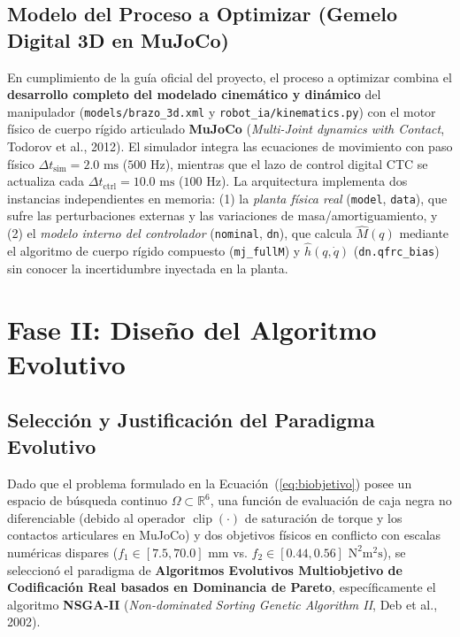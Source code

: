 \documentclass[11pt,a4paper]{article}
\begin{document}
\subsection{Modelo del Proceso a Optimizar (Gemelo Digital 3D en MuJoCo)}
En cumplimiento de la guía oficial del proyecto, el proceso a optimizar combina el \textbf{desarrollo completo del modelado cinemático y dinámico} del manipulador (\texttt{models/brazo\_3d.xml} y \texttt{robot\_ia/kinematics.py}) con el motor físico de cuerpo rígido articulado \textbf{MuJoCo} (\textit{Multi-Joint dynamics with Contact}, Todorov et al., 2012). El simulador integra las ecuaciones de movimiento con paso físico $\Delta t_{\text{sim}} = 2.0\text{ ms}$ ($500\text{ Hz}$), mientras que el lazo de control digital CTC se actualiza cada $\Delta t_{\text{ctrl}} = 10.0\text{ ms}$ ($100\text{ Hz}$). La arquitectura implementa dos instancias independientes en memoria: (1) la \textit{planta física real} (\texttt{model}, \texttt{data}), que sufre las perturbaciones externas y las variaciones de masa/amortiguamiento, y (2) el \textit{modelo interno del controlador} (\texttt{nominal}, \texttt{dn}), que calcula $\hat{M}(q)$ mediante el algoritmo de cuerpo rígido compuesto (\texttt{mj\_fullM}) y $\hat{h}(q,\dot{q})$ (\texttt{dn.qfrc\_bias}) sin conocer la incertidumbre inyectada en la planta.

\section{Fase II: Diseño del Algoritmo Evolutivo}

\subsection{Selección y Justificación del Paradigma Evolutivo}
Dado que el problema formulado en la Ecuación~(\ref{eq:biobjetivo}) posee un espacio de búsqueda continuo $\Omega \subset \mathbb{R}^6$, una función de evaluación de caja negra no diferenciable (debido al operador $\operatorname{clip}(\cdot)$ de saturación de torque y los contactos articulares en MuJoCo) y dos objetivos físicos en conflicto con escalas numéricas dispares ($f_1 \in [7.5, 70.0]\text{ mm}$ vs. $f_2 \in [0.44, 0.56]\text{ N}^2\text{m}^2\text{s}$), se seleccionó el paradigma de \textbf{Algoritmos Evolutivos Multiobjetivo de Codificación Real basados en Dominancia de Pareto}, específicamente el algoritmo \textbf{NSGA-II} (\textit{Non-dominated Sorting Genetic Algorithm II}, Deb et al., 2002).
\end{document}
